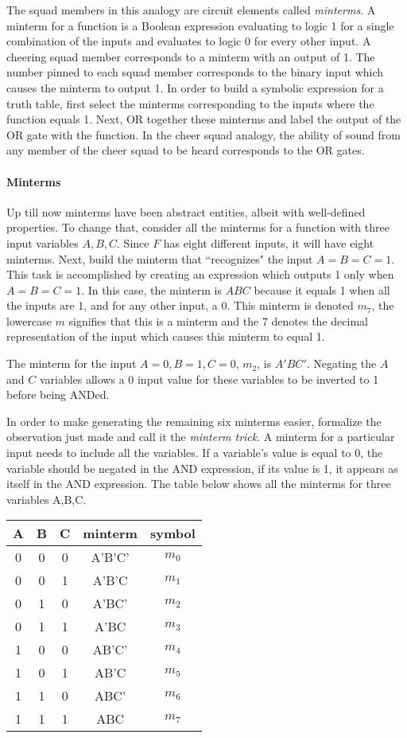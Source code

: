 The squad members in this analogy are circuit elements called 
\textit{minterms}.  A minterm for a function 
is a Boolean expression evaluating to logic 1 for a single 
combination of the inputs and evaluates to logic 0 for every 
other input.  A cheering squad member corresponds to a minterm with 
an output of 1.  The number pinned to each squad member corresponds
to the binary input which causes the minterm to output 1.  In order 
to build a symbolic expression for a truth table, first select the
minterms corresponding to the inputs where the function equals 1.  
Next, OR together these minterms and label the output of
the OR gate with the function.  In the cheer squad analogy, the ability of
sound from any member of the cheer squad to be heard corresponds
to the OR gates.  

\paragraph{Minterms}
Up till now minterms have been abstract entities, albeit with
well-defined properties.  To change that, consider all
the minterms for a function  with three input variables 
$A,B,C$.  Since $F$ has eight different inputs, it will have eight 
minterms.  Next, build the minterm that ``recognizes" the input $A=B=C=1$.  
This task is accomplished by creating an expression which outputs 1 only when 
$A=B=C=1$.  In this case, the minterm is $ABC$ because it equals 
1 when all the inputs are 1, and for any other input, a 0.
This minterm is denoted $m_7$, the lowercase $m$ signifies that 
this is a minterm and the 7 denotes the decimal representation 
of the input which causes this minterm to equal 1.  

The minterm
for the input $A=0, B=1, C=0$, $m_2$, is $A'BC'$.  Negating the
$A$ and $C$ variables allows a 0 input value for these variables to 
be inverted to 1 before being ANDed.  

In order to make generating 
the remaining six minterms easier, formalize the observation 
just made and call it the \textit{minterm trick}.  
 \label{page:MinTrick}
A minterm for a particular input needs to include all the variables.
If a variable's value is equal to 0, the variable should be negated in 
the AND expression, if its value is 1, it appears as itself in the
AND expression. The table below shows all the minterms for three 
variables A,B,C.

\begin{tabular}{c|c|c||c|c}
A & B & C & minterm & symbol	\\ \hline
0 & 0 & 0 & A'B'C'  & $m_0$	\\ \hline
0 & 0 & 1 & A'B'C   & $m_1$	\\ \hline
0 & 1 & 0 & A'BC'   & $m_2$	\\ \hline
0 & 1 & 1 & A'BC    & $m_3$	\\ \hline
1 & 0 & 0 & AB'C'   & $m_4$	\\ \hline
1 & 0 & 1 & AB'C    & $m_5$	\\ \hline
1 & 1 & 0 & ABC'    & $m_6$	\\ \hline
1 & 1 & 1 & ABC     & $m_7$	\\ 
\end{tabular}

